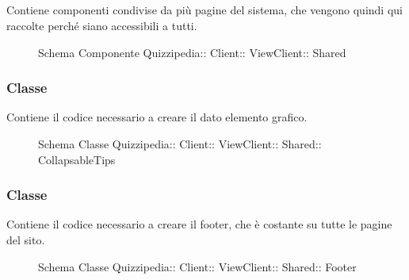 \subsection{}
Contiene componenti condivise da più pagine del sistema, che vengono quindi qui raccolte perché siano accessibili a tutti.
\begin{figure}[H]
\centering
\noindent{}
\caption[Schema Componente Quizzipedia::Client::ViewClient::Shared]{Schema Componente Quizzipedia:: Client:: ViewClient:: Shared}
\end{figure}
\subsubsection{Classe }
Contiene il codice necessario a creare il dato elemento grafico.
\begin{figure}[H]
\centering
\noindent{}
\caption[Schema Classe CollapsableTips]{Schema Classe Quizzipedia:: Client:: ViewClient:: Shared:: CollapsableTips}
\end{figure}
\subsubsection{Classe }
Contiene il codice necessario a creare il footer, che è costante su tutte le pagine del sito.
\begin{figure}[H]
\centering
\noindent{}
\caption[Schema Classe Footer]{Schema Classe Quizzipedia:: Client:: ViewClient:: Shared:: Footer}
\end{figure}
